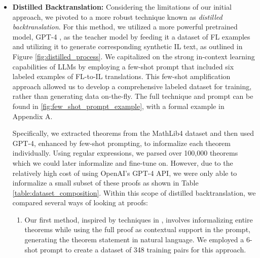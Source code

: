 \documentclass{article} %
\begin{document}
\begin{itemize}
\begin{figure}[ht]
\caption{\textbf{On-The-Fly Backtranslation Process Graph}. Given the scarcity of pairs of formal and informal mathematics, our solution is to generate artificial informal language (IL) translations from a formal language dataset (FL), then use the (IL, FL) pairs for training. This methodology first uses the LLM to translate from FL to IL, and then translates back to FL. This avoids the problem of lack of paired data by having the model generate training data on the fly to teach itself.}
\label{fig:on_the_fly_process}
\end{figure}

\item \textbf{Distilled Backtranslation:} Considering the limitations of our initial approach, we pivoted to a more robust technique known as \textit{distilled backtranslation}. For this method, we utilized a more powerful pretrained model, GPT-4 \citep{openai2023gpt4}, as the teacher model by feeding it a dataset of FL examples and utilizing it to generate corresponding synthetic IL text, as outlined in Figure \ref{fig:distilled_process}. We capitalized on the strong in-context learning capabilities of LLMs \citep{brown2020language} by employing a few-shot prompt that included six labeled examples of FL-to-IL translations. This few-shot amplification approach allowed us to develop a comprehensive labeled dataset for training, rather than generating data on-the-fly. The full technique and prompt can be found in \ref{fig:few_shot_prompt_example}, with a formal example in Appendix A.

Specifically, we extracted theorems from the MathLib4 dataset \citep{mathlib4} and then used GPT-4, enhanced by few-shot prompting, to informalize each theorem individually. Using regular expressions, we parsed over 100,000 theorems which we could later informalize and fine-tune on. However, due to the relatively high cost of using OpenAI's GPT-4 API, we were only able to informalize a small subset of these proofs as shown in Table \ref{table:dataset_composition}. Within this scope of distilled backtranslation, we compared several ways of looking at proofs:
\begin{enumerate}
    
    \item Our first method, inspired by techniques in \cite{azerbayev2023proofnet}, involves informalizing entire theorems while using the full proof as contextual support in the prompt, generating the theorem statement in natural language. We employed a 6-shot prompt to create a dataset of 348 training pairs for this approach.
    

\end{enumerate}
\end{itemize}
\end{document}
